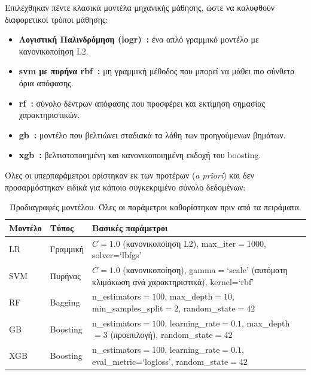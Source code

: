 Επιλέχθηκαν πέντε κλασικά μοντέλα μηχανικής μάθησης, ώστε να καλυφθούν διαφορετικοί τρόποι μάθησης:

\begin{itemize}
    \item \textbf{Λογιστική Παλινδρόμηση (\gls{logr})~\citep{nelder1972glm,cox1958regression,hosmer2013applied_logistic_regression}:} ένα απλό γραμμικό μοντέλο με κανονικοποίηση L2.
    \item \textbf{\gls{svm} με πυρήνα \gls{rbf}~\citep{cortes1995support}:} μη γραμμική μέθοδος που μπορεί να μάθει πιο σύνθετα όρια απόφασης.
    \item \textbf{\gls{rf}~\citep{breiman2001random}:} σύνολο δέντρων απόφασης που προσφέρει και εκτίμηση σημασίας χαρακτηριστικών.
    \item \textbf{\gls{gb}~\cite{friedman2001greedy}:} μοντέλο που βελτιώνει σταδιακά τα λάθη των προηγούμενων βημάτων.
    \item \textbf{\gls{xgb}~\cite{chen2016xgboost}:} βελτιστοποιημένη και κανονικοποιημένη εκδοχή του boosting.
\end{itemize}

Όλες οι υπερπαράμετροι ορίστηκαν εκ των προτέρων (\emph{a priori}) και δεν προσαρμόστηκαν ειδικά για κάποιο συγκεκριμένο σύνολο δεδομένων:

\begin{table}[H]
\centering
\begin{tabular}{@{}llp{9cm}@{}}
\toprule
\textbf{Μοντέλο} & \textbf{Τύπος} & \textbf{Βασικές παράμετροι} \\
\midrule
LR & Γραμμική & $C=1.0$ (κανονικοποίηση L2), max\_iter$=1000$, solver=`lbfgs' \\
SVM & Πυρήνας & $C=1.0$ (κανονικοποίηση), gamma$=$`scale' (αυτόματη κλιμάκωση ανά χαρακτηριστικά), kernel=`rbf' \\
RF & Bagging & n\_estimators$=100$, max\_depth$=10$, min\_samples\_split$=2$, random\_state$=42$ \\
GB & Boosting & n\_estimators$=100$, learning\_rate$=0.1$, max\_depth$=3$ (προεπιλογή), random\_state$=42$ \\
XGB & Boosting & n\_estimators$=100$, learning\_rate$=0.1$, eval\_metric=`logloss', random\_state$=42$ \\
\bottomrule
\end{tabular}
\caption{Προδιαγραφές μοντέλου. Όλες οι παράμετροι καθορίστηκαν πριν από τα πειράματα.}
\label{tab:model-specs}
\end{table}

